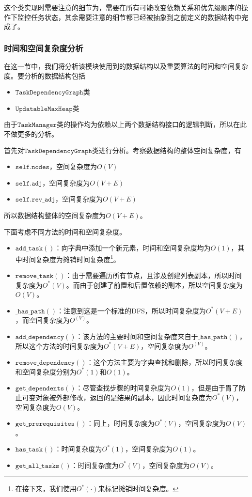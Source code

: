\documentclass[cn,hazy,blue,10pt,normal]{elegantnote}
\begin{document}
这个类实现时需要注意的细节为，需要在所有可能改变依赖关系和优先级顺序的操作下监控任务状态，其余需要注意的细节都已经被抽象到之前定义的数据结构中完成了。

\subsubsection{时间和空间复杂度分析}
在这一节中，我们将分析该模块使用到的数据结构以及重要算法的时间和空间复杂度。要分析的数据结构包括
\begin{itemize}
    \item $\mathtt{TaskDependencyGraph}$类
    \item $\mathtt{UpdatableMaxHeap}$类
\end{itemize}
由于$\mathtt{TaskManager}$类的操作均为依赖以上两个数据结构接口的逻辑判断，所以在此不做更多的分析。

首先对$\mathtt{TaskDependencyGraph}$类进行分析。考察数据结构的整体空间复杂度，有
\begin{itemize}
    \item $\mathtt{self.nodes}$，空间复杂度为$O(V)$
    \item $\mathtt{self.adj}$，空间复杂度为$O(V+E)$
    \item $\mathtt{self.rev\_adj}$，空间复杂度为$O(V+E)$
\end{itemize}
所以数据结构整体的空间复杂度为$O(V+E)$。

下面考虑不同方法的时间和空间复杂度。

\begin{itemize}
    \item $\mathtt{add\_task()}$：向字典中添加一个新元素，时间和空间复杂度均为$O(1)$，其中时间复杂度为摊销时间复杂度\footnote{在接下来，我们使用$O^*(\cdot)$来标记摊销时间复杂度。}。
    \item $\mathtt{remove\_task()}$：由于需要遍历所有节点，且涉及创建列表副本，所以时间复杂度为$O^*(V)$。而由于创建了前置和后置依赖的副本，所以空间复杂度为$O(V)$。
    \item $\mathtt{\_has\_path()}$：注意到这是一个标准的DFS，所以时间复杂度为$O^*(V+E)$，而空间复杂度为$O^(V)$。
    \item $\mathtt{add\_dependency()}$：该方法的主要时间和空间复杂度来自于$\mathtt{\_has\_path()}$，所以这个方法的时间复杂度为$O^*(V+E)$，空间复杂度为$O^(V)$。
    \item $\mathtt{remove\_dependency()}$：这个方法主要为字典查找和删除，所以时间复杂度和空间复杂度分别为$O^*(1)$和$O(1)$。
    \item $\mathtt{get\_dependents()}$：尽管查找步骤的时间复杂度为$O(1)$，但是由于胃了防止可变对象被外部修改，返回的是结果的副本，因此时间复杂度为$O^*(V)$，空间复杂度为$O(V)$。
    \item $\mathtt{get\_prerequisites()}$：同上，时间复杂度为$O^*(V)$，空间复杂度为$O(V)$。
    \item $\mathtt{has\_task()}$：时间复杂度为$O^*(1)$，空间复杂度为$O(1)$。
    \item $\mathtt{get\_all\_tasks()}$：时间复杂度为$O^*(V)$，空间复杂度为$O(V)$。
\end{itemize}
\end{document}
